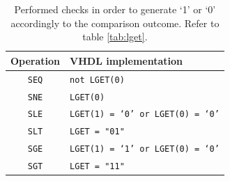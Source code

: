 \begin{table}[H]
	\begin{center}
		\begin{tabular}{ c | l}
			\textbf{Operation} & \textbf{VHDL implementation} \\
			\hline
			\texttt{SEQ} & \texttt{not LGET(0)} \\
			\texttt{SNE} & \texttt{LGET(0)} \\
			\texttt{SLE} & \texttt{LGET(1) = `0' or LGET(0) = `0'} \\
			\texttt{SLT} & \texttt{LGET = "01"} \\
			\texttt{SGE} & \texttt{LGET(1) = `1' or LGET(0) = `0'} \\
			\texttt{SGT} & \texttt{LGET = "11"}
			
		\end{tabular}
		\caption{Performed checks in order to generate `1' or `0' accordingly to the comparison outcome. Refer to table \ref{tab:lget}.}
	\end{center}
\end{table}


